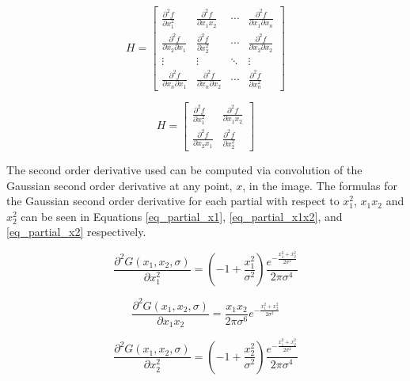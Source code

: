 \documentclass[sigconf]{acmart/acmart}
\begin{document}
\begin{equation}
H = \begin{bmatrix}
\frac{\partial^2 f}{\partial x_1^2} & \frac{\partial^2 f}{\partial x_1 x_2} & \cdots & \frac{\partial^2 f}{\partial x_1 \partial x_n} \\
\frac{\partial^2 f}{\partial x_2 \partial x_1} & \frac{\partial^2 f}{\partial x_2^2} & \cdots & \frac{\partial^2 f}{\partial x_2 \partial x_2} \\
\vdots & \vdots & \ddots & \vdots \\
\frac{\partial^2 f}{\partial x_n \partial x_1} & \frac{\partial^2 f}{\partial x_n \partial x_2} & \cdots & \frac{\partial^2 f}{\partial x_n^2}
\end{bmatrix}
\label{eq_hessian_general}
\end{equation}

\begin{equation}
H = \begin{bmatrix}
\frac{\partial^2 f}{\partial x_1^2} & \frac{\partial^2 f}{\partial x_1 x_2} \\
\frac{\partial^2 f}{\partial x_2 x_1} & \frac{\partial^2 f}{\partial x_2^2}
\end{bmatrix}
\label{eq_hessian_r2}
\end{equation}

The second order derivative used can be computed via convolution of the Gaussian second order derivative at any point, $x$, in the image. The formulas for the Gaussian second order derivative for each partial with respect to $x_1^2$, $x_1 x_2$ and $x_2^2$ can be seen in Equations \ref{eq_partial_x1}, \ref{eq_partial_x1x2}, and \ref{eq_partial_x2} respectively.

\begin{equation}
\frac{\partial^2 G(x_1,x_2,\sigma)}{\partial x_1^2} = (-1 + \frac{x_1^2}{\sigma^2})\frac{e^{-\frac{x_1^2+x_2^2}{2\sigma^2}}}{2\pi \sigma^4}
\label{eq_partial_x1}
\end{equation}

\begin{equation}
\frac{\partial^2 G(x_1,x_2,\sigma)}{\partial x_1 x_2} = \frac{x_1 x_2}{2 \pi \sigma^6}e^{-\frac{x_1^2 + x_2^2}{2 \sigma^2}}
\label{eq_partial_x1x2}
\end{equation}

\begin{equation}
\frac{\partial^2 G(x_1,x_2,\sigma)}{\partial x_2^2} = (-1 + \frac{x_2^2}{\sigma^2})\frac{e^{-\frac{x_1^2+x_2^2}{2\sigma^2}}}{2\pi \sigma^4}
\label{eq_partial_x2}
\end{equation}
\end{document}
